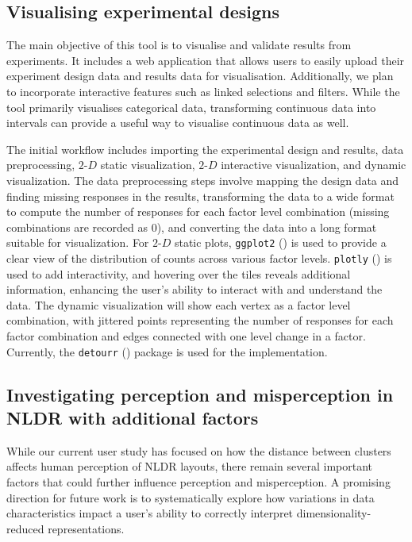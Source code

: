 \documentclass[
  11pt,
  a4paper,
]{report}
\begin{document}
\subsection{Visualising experimental
designs}\label{visualising-experimental-designs}

The main objective of this tool is to visualise and validate results
from experiments. It includes a web application that allows users to
easily upload their experiment design data and results data for
visualisation. Additionally, we plan to incorporate interactive features
such as linked selections and filters. While the tool primarily
visualises categorical data, transforming continuous data into intervals
can provide a useful way to visualise continuous data as well.

The initial workflow includes importing the experimental design and
results, data preprocessing, \(2\text{-}D\) static visualization,
\(2\text{-}D\) interactive visualization, and dynamic visualization. The
data preprocessing steps involve mapping the design data and finding
missing responses in the results, transforming the data to a wide format
to compute the number of responses for each factor level combination
(missing combinations are recorded as \(0\)), and converting the data
into a long format suitable for visualization. For \(2\text{-}D\) static
plots, \texttt{ggplot2}
() is used to provide a
clear view of the distribution of counts across various factor levels.
\texttt{plotly} () is
used to add interactivity, and hovering over the tiles reveals
additional information, enhancing the user's ability to interact with
and understand the data. The dynamic visualization will show each vertex
as a factor level combination, with jittered points representing the
number of responses for each factor combination and edges connected with
one level change in a factor. Currently, the \texttt{detourr}
() package is used for
the implementation.

\subsection{Investigating perception and misperception in NLDR with
additional
factors}\label{investigating-perception-and-misperception-in-nldr-with-additional-factors}

While our current user study has focused on how the distance between
clusters affects human perception of NLDR layouts, there remain several
important factors that could further influence perception and
misperception. A promising direction for future work is to
systematically explore how variations in data characteristics impact a
user's ability to correctly interpret dimensionality-reduced
representations.
\end{document}
